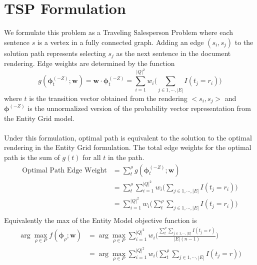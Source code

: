 \documentclass{article}
\newcommand{\entities}{E}
\newcommand{\roles}{Q}
\newcommand{\tv}{t}
\newcommand{\sent}{s}
\newcommand{\weight}{\mathbf{w}}
\newcommand{\rendering}{\rho}
\newcommand{\renderings}{P}
\newcommand{\obj}{f}
\begin{document}
\section{TSP Formulation}
We formulate this problem as a Traveling Salesperson Problem where each sentence $\sent$ is a vertex in a fully connected graph. 
Adding an edge $(\sent_i,\sent_j)$ to the solution path represents selecting $\sent_j$ as the next sentence in the document rendering. 
Edge weights are determined by the function
\begin{equation}
g(\boldsymbol{\phi}^{(-Z)}_\tv;\weight) = \weight\cdot \boldsymbol{\phi}^{(-Z)}_\tv = \sum^{|\roles|^2}_{i=1} w_i \Big( \sum_{j\in1,\cdots,|\entities|} I(\tv_{j}= r_i) \Big)
\end{equation}
where $\tv$ is the transition vector obtained from the rendering $<\sent_i,\sent_j>$ and $\boldsymbol{\phi}^{(-Z)}$ is the unnormalized version of the probability vector representation from the Entity Grid model.\\\\
Under this formulation, optimal path is equivalent to the solution to the optimal rendering in the Entity Grid formulation. 
The total edge weights for the optimal path is the sum of $g(\tv)$ for all $\tv$ in the path.
\begin{equation*}
\begin{split}
\textrm{Optimal Path Edge Weight} &= \sum^\rendering_{t} g(\boldsymbol{\phi}^{(-Z)}_\tv;\weight)\\
& = \sum^\rendering_{t} \sum^{|\roles|^2}_{i=1} w_i \Big( \sum_{j\in1,\cdots,|\entities|} I(\tv_{j}= r_i) \Big)\\
& = \sum^{|\roles|^2}_{i=1} w_i \Big( \sum^\rendering_{t} \sum_{j\in1,\cdots,|\entities|} I(\tv_{j}= r_i) \Big)\\
\end{split}
\end{equation*}
Equivalently the max of the Entity Model objective function is
\begin{equation*}
\begin{split}
\operatorname{arg} \max_{\rendering \in \renderings} \obj(\boldsymbol{\phi}_\rendering ; \weight ) & =\operatorname{arg} \max_{\rendering \in \renderings}\sum^{|\roles|^2}_{i=1} w_i \Big( \frac{\sum_{\tv}^\rendering\sum_{j\in1,\cdots,|\entities|} I(\tv_{j}= r)  }{|\entities|(n-1)}   \Big)\\
& =\operatorname{arg} \max_{\rendering \in \renderings}\sum^{|\roles|^2}_{i=1} w_i \Big( \sum_{\tv}^\rendering\sum_{j\in1,\cdots,|\entities|} I(\tv_{j}= r)     \Big)\\
\end{split}
\end{equation*} 
\end{document}
